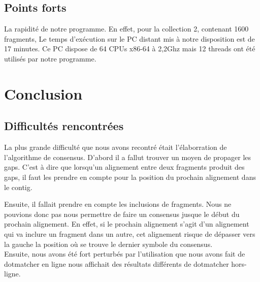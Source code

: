 \documentclass[a4paper, 12pt, titlepage]{article}
\begin{document}
\subsection*{Points forts}
La rapidité de notre programme. En effet, pour la collection 2, contenant 1600 fragments,
Le temps d'exécution sur le PC distant mis à notre disposition est de 17 minutes.
Ce PC dispose de 64 CPUs x86-64 à 2,2Ghz mais 12 threads ont été utilisés par notre programme.

\section{Conclusion}
\subsection{Difficultés rencontrées}
La plus grande difficulté que nous avons recontré était l'élaborration de l'algorithme de consensus.
D'abord il a fallut trouver un moyen de propager les gaps.
C'est à dire que lorsqu'un alignement entre deux fragments produit des gaps, il faut les prendre en compte pour la position du prochain alignement dans le contig.

Ensuite, il fallait prendre en compte les inclusions de fragments.
Nous ne pouvions donc pas nous permettre de faire un consensus jusque le début du prochain alignement.
En effet, si le prochain alignement s'agit d'un alignement qui va inclure un fragment dans un autre, cet alignement risque de dépasser vers la gauche la position où se trouve le dernier symbole du consensus.\\

Ensuite, nous avons été fort perturbés par l'utilisation que nous avons fait de dotmatcher en ligne nous affichait des résultats différents de dotmatcher hors-ligne.
\end{document}
